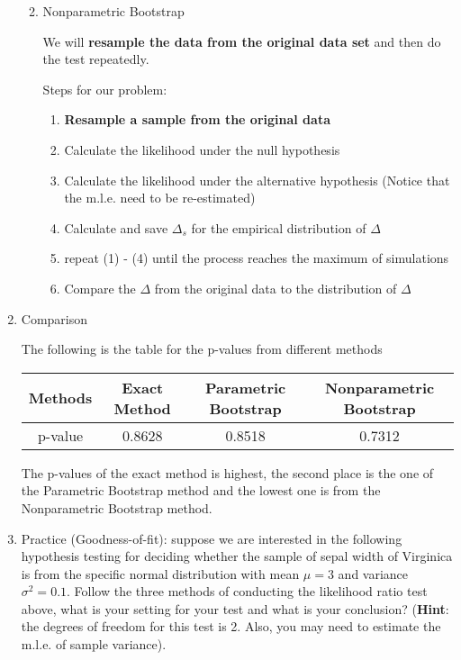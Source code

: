 \begin{enumerate}
\begin{enumerate}
\begin{enumerate}
				\end{enumerate}
			\item Nonparametric Bootstrap
				\par We will \textbf{resample the data from the original data set} and then do the test repeatedly.
				\par Steps for our problem:
				\begin{enumerate}
					\item \textbf{Resample a sample from the original data}
					\item Calculate the likelihood under the null hypothesis
					\item Calculate the likelihood under the alternative hypothesis (Notice that the m.l.e. need to be re-estimated)
					\item Calculate and save $\Delta_s$ for the empirical distribution of $\Delta$
					\item repeat (1) - (4) until the process reaches the maximum of simulations
					\item Compare the $\Delta$ from the original data to the distribution of $\Delta$
				\end{enumerate}
		\end{enumerate}
	\item Comparison
		\par The following is the table for the p-values from different methods
		\begin{center}
			\begin{tabular}{c | c | c | c}
				Methods & Exact Method & Parametric Bootstrap & Nonparametric Bootstrap \\
				\hline
				p-value & 0.8628 & 0.8518 & 0.7312 \\
			\end{tabular}
		\end{center}
		The p-values of the exact method is highest, the second place is the one of the Parametric Bootstrap method and the lowest one is from the Nonparametric Bootstrap method.
	\item Practice (Goodness-of-fit): suppose we are interested in the following hypothesis testing for deciding whether the sample of sepal width of Virginica is from the specific normal distribution with mean $\mu=3$ and variance $\sigma^2 = 0.1$. Follow the three methods of conducting the likelihood ratio test above, what is your setting for your test and what is your conclusion? (\textbf{Hint}: the degrees of freedom for this test is 2. Also, you may need to estimate the m.l.e. of sample variance).
\end{enumerate}
